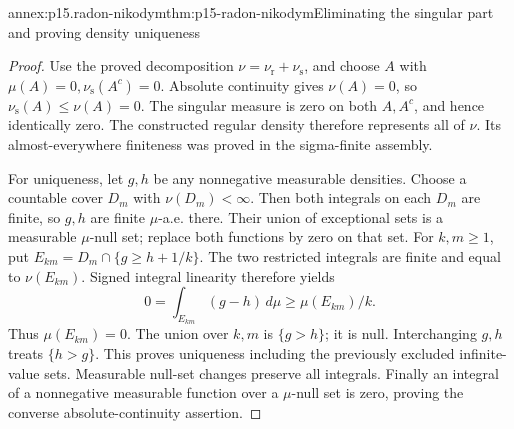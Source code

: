 \begin{annexitem}{annex:p15.radon-nikodym}{thm:p15-radon-nikodym}{Eliminating the singular part and proving density uniqueness}
\begin{proof}
Use the proved decomposition \(\nu=\nu_{\mathrm r}+\nu_{\mathrm s}\),
and choose \(A\) with \(\mu(A)=0,\nu_{\mathrm s}(A^c)=0\).
Absolute continuity gives \(\nu(A)=0\), so
\(\nu_{\mathrm s}(A)\leq\nu(A)=0\). The singular measure is zero
on both \(A,A^c\), and hence identically zero.
The constructed regular density therefore represents all of \(\nu\).
Its almost-everywhere finiteness was proved in the sigma-finite assembly.

For uniqueness, let \(g,h\) be any nonnegative measurable densities.
Choose a countable cover \(D_m\) with \(\nu(D_m)<\infty\).
Then both integrals on each \(D_m\) are finite, so \(g,h\) are finite
\(\mu\)-a.e. there. Their union of exceptional sets is a measurable
\(\mu\)-null set; replace both functions by zero on that set.
For \(k,m\geq1\), put \(E_{km}=D_m\cap\{g\geq h+1/k\}\).
The two restricted integrals are finite and equal to \(\nu(E_{km})\).
Signed integral linearity therefore yields
\[
            0=\int_{E_{km}}(g-h)\,d\mu\geq\mu(E_{km})/k .
\]
Thus \(\mu(E_{km})=0\). The union over \(k,m\) is \(\{g>h\}\);
it is null. Interchanging \(g,h\) treats \(\{h>g\}\).
This proves uniqueness including the previously excluded infinite-value
sets. Measurable null-set changes preserve all integrals.
Finally an integral of a nonnegative measurable function over a
\(\mu\)-null set is zero, proving the converse absolute-continuity assertion.
\end{proof}
\end{annexitem}

